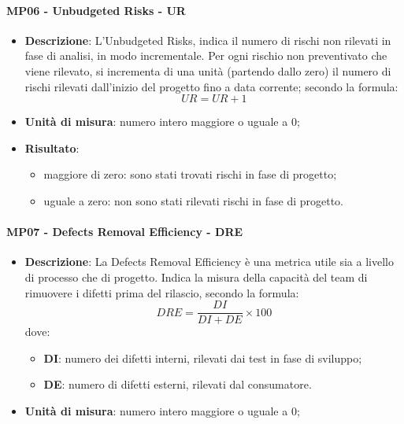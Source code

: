  		\paragraph{MP06 - Unbudgeted Risks - UR}
 		\begin{itemize}
 			\item \textbf{Descrizione}:
 			L'Unbudgeted Risks, indica il numero di rischi non rilevati in fase di analisi, in modo incrementale. Per ogni rischio non preventivato che viene rilevato, si incrementa di una unità (partendo dallo zero) il numero di rischi rilevati dall'inizio del progetto fino a data corrente; secondo la formula:
 			\begin{displaymath}
 				UR = UR + 1
 			\end{displaymath}
 			\item \textbf{Unità di misura}: numero intero maggiore o uguale a 0;
 			\item \textbf{Risultato}:
 			\begin{itemize}
 				\item maggiore di zero: sono stati trovati rischi in fase di progetto;
 				\item uguale a zero: non sono stati rilevati rischi in fase di progetto. \\
 			\end{itemize}
 		\end{itemize}

 		\paragraph{MP07 - Defects Removal Efficiency - DRE}
 		\begin{itemize}
 			\item \textbf{Descrizione}:
 			La Defects Removal Efficiency è una metrica utile sia a livello di processo che di progetto. Indica la misura della capacità del team di rimuovere i difetti prima del rilascio, secondo la formula:
 			\begin{displaymath}
 				DRE = \frac{DI}{DI+DE}\times100
 			\end{displaymath}
 			dove:
 			\begin{itemize}
 				\item {\bfseries DI}: numero dei difetti interni, rilevati dai test in fase di sviluppo;
 				\item {\bfseries DE}: numero di difetti esterni, rilevati dal consumatore.
 			\end{itemize}
 			\item \textbf{Unità di misura}: numero intero maggiore o uguale a 0; \\
 		\end{itemize}

